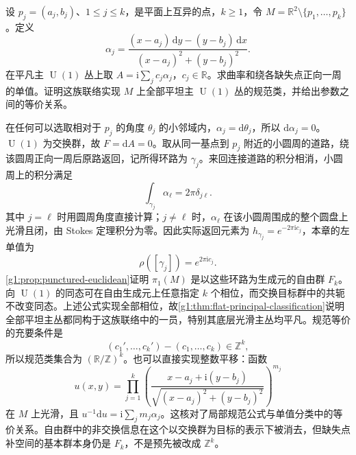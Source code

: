 \begin{exercise}\label{g1:ex:punctured-plane-flat-principal}
	设 \(p_j=(a_j,b_j)\)、\(1\le j\le k\)，是平面上互异的点，\(k\ge1\)，令 \(M=\mathbb R^2\setminus\{p_1,\ldots,p_k\}\)。定义
	\[
		\alpha_j=\frac{(x-a_j)\,\mathrm{d}y-(y-b_j)\,\mathrm{d}x}
		{(x-a_j)^2+(y-b_j)^2}.
	\]
	在平凡主 \(\operatorname{U}(1)\) 丛上取 \(A=\mathrm{i}\sum_j c_j\alpha_j\)，\(c_j\in\mathbb R\)。求曲率和绕各缺失点正向一周的单值。证明这族联络实现 \(M\) 上全部平坦主 \(\operatorname{U}(1)\) 丛的规范类，并给出参数之间的等价关系。
\end{exercise}
\begin{solution}
	在任何可以选取相对于 \(p_j\) 的角度 \(\theta_j\) 的小邻域内，\(\alpha_j=\mathrm{d}\theta_j\)，所以 \(\mathrm{d}\alpha_j=0\)。\(\operatorname{U}(1)\) 为交换群，故 \(F=\mathrm{d}A=0\)。取从同一基点到 \(p_j\) 附近的小圆周的道路，绕该圆周正向一周后原路返回，记所得环路为 \(\gamma_j\)。来回连接道路的积分相消，小圆周上的积分满足
	\[
		\int_{\gamma_j}\alpha_\ell=2\pi\delta_{j\ell}.
	\]
	其中 \(j=\ell\) 时用圆周角度直接计算；\(j\ne\ell\) 时，\(\alpha_\ell\) 在该小圆周围成的整个圆盘上光滑且闭，由 Stokes 定理积分为零。因此实际返回元素为 \(h_{\gamma_j}=e^{-2\pi\mathrm{i}c_j}\)，本章的左单值为
	\[
		\rho([\gamma_j])=e^{2\pi\mathrm{i}c_j}.
	\]
	\cref{g1:prop:punctured-euclidean}证明 \(\pi_1(M)\) 是以这些环路为生成元的自由群 \(F_k\)。向 \(\operatorname{U}(1)\) 的同态可在自由生成元上任意指定 \(k\) 个相位，而交换目标群中的共轭不改变同态。上述公式实现全部相位，故\cref{g1:thm:flat-principal-classification}说明全部平坦主丛都同构于这族联络中的一员，特别其底层光滑主丛均平凡。规范等价的充要条件是
	\[
		(c_1',\ldots,c_k')-(c_1,\ldots,c_k)\in\mathbb Z^k,
	\]
	所以规范类集合为 \((\mathbb R/\mathbb Z)^k\)。也可以直接实现整数平移：函数
	\[
		u(x,y)=\prod_{j=1}^k
		\left(\frac{x-a_j+\mathrm{i}(y-b_j)}{\sqrt{(x-a_j)^2+(y-b_j)^2}}\right)^{m_j}
	\]
	在 \(M\) 上光滑，且 \(u^{-1}\mathrm{d}u=\mathrm{i}\sum_jm_j\alpha_j\)。这核对了局部规范公式与单值分类中的等价关系。自由群中的非交换信息在这个以交换群为目标的表示下被消去，但缺失点补空间的基本群本身仍是 \(F_k\)，不是预先被改成 \(\mathbb Z^k\)。
\end{solution}

